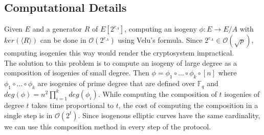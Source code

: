 \subsection{Computational Details}

Given $E$ and a generator $R$ of $E[2^{e_A}]$, computing an isogeny $\phi:E \to E/A$ with $ker(\langle R \rangle)$  can be done in $\mathcal{O}(2^{e_A})$ using Velu's formula. %
Since $2^{e_A} \in \mathcal{O}(\sqrt{p})$, computing isogenies this way would render the cryptosystem impractical.\\
	
The solution to this problem is to compute an isogeny of large degree as a composition of isogenies of small degree. Then $\phi = \phi_1 \circ \dots \circ \phi_k \circ [n]$ where $\phi_1 \circ \dots \circ \phi_k$ are isogenies of prime degree that are defined over $\mathbb{F}_q$ and $deg(\phi) = n^2 \prod^k_{i=1} deg(\phi_i)$. While computing the composition of $t$ isogenies of degree $t$ takes time proportional to $t$, the cost of computing the composition in a single step is in $\mathcal{O}(2^t)$. Since isogenous elliptic curves have the same cardinality, we can use this composition method in every step of the protocol.